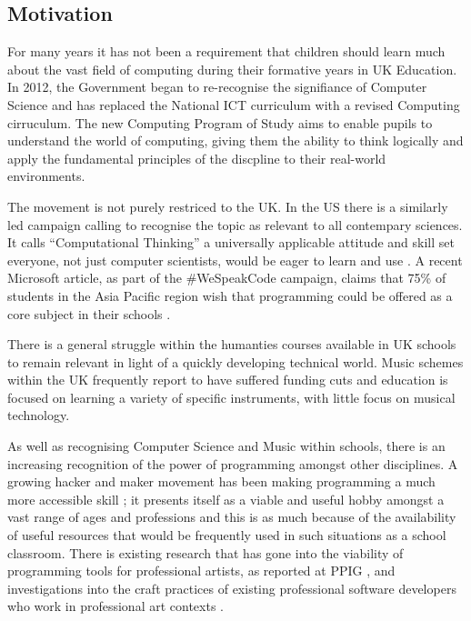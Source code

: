 \documentclass[11pt, abstracton, twoside, titlepage=true]{scrartcl}
\begin{document}
\subsection{Motivation}
For many years it has not been a requirement that children should learn much
about the vast field of computing during their formative years in UK 
Education. In 2012, the Government began to re-recognise the signifiance of 
Computer Science and has replaced the National ICT curriculum with a revised 
Computing cirruculum. The new Computing Program of Study \cite{DfE13} aims to 
enable pupils to understand the world of computing, giving them the ability to 
think logically and apply the fundamental principles of the discpline to their 
real-world environments.

The movement is not purely restriced to the UK. In the US there is a similarly 
led campaign calling to recognise the topic as relevant to all contempary 
sciences. It calls ``Computational Thinking'' a universally applicable 
attitude and skill set everyone, not just computer scientists, would be eager 
to learn and use \cite{Wing06}. A recent Microsoft article, as part of the 
\#WeSpeakCode campaign, claims that 75\% of students in the Asia Pacific region
wish that programming could be offered as a core subject in their schools \cite{micro}.

There is a general struggle within the humanties courses available in UK schools 
to remain relevant in light of a quickly developing technical world. Music schemes 
within the UK frequently report to have suffered funding cuts and education is 
focused on learning a variety of specific instruments, with little focus on 
musical technology.

As well as recognising Computer Science and Music within schools, there 
is an increasing recognition of the power of programming amongst other disciplines. 
A growing hacker and maker movement has been making programming a 
much more accessible skill \cite{BAD14}; it presents itself as a viable and 
useful hobby amongst a vast range of ages and professions and this is as much 
because of the availability of useful resources that would be frequently used 
in such situations as a school classroom. There is existing research that has 
gone into the viability of programming tools for professional artists, as 
reported at PPIG \cite{Ch12,BC05}, and investigations into the craft practices 
of existing professional software developers who work in professional art 
contexts \cite{W10}.
\end{document}
